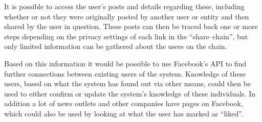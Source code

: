 \nl
It is possible to access the user's posts and details regarding these, including whether or not they were originally
posted by another user or entity and then shared by the user in question.
These posts can then be traced back one or more steps depending on the privacy settings of each link in the
``share--chain'', but only limited information can be gathered about the users on the chain.

\nl
Based on this information it would be possible to use Facebook's API to find further connections between existing users
of the system.
Knowledge of these users, based on what the system has found out via other means, could then be used to either confirm
or update the system's knowledge of these individuals.
In addition a lot of news outlets and other companies have pages on Facebook, which could also be used by looking at
what the user has marked as ``liked''.
